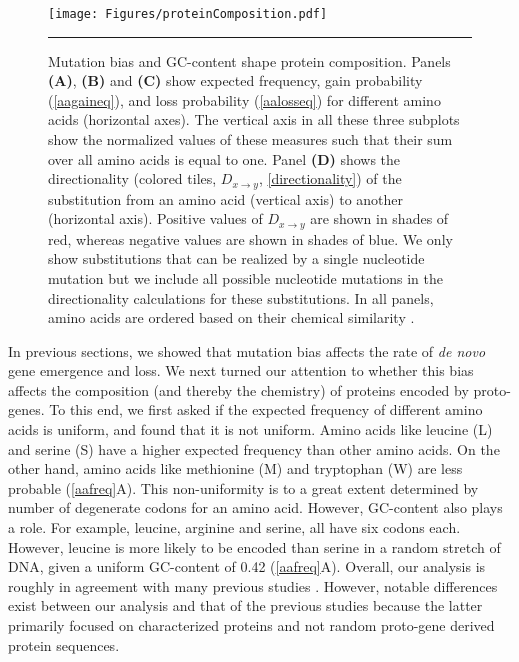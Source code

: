 \documentclass[12pt,a4paper]{article}
\begin{document}
\begin{figure}[!t]
\centering
\texttt{[image: Figures/proteinComposition.pdf]}

\caption{Mutation bias and GC-content shape protein composition. Panels \textbf{(A)}, \textbf{(B)} and \textbf{(C)} show expected frequency, gain probability (\autoref{aagaineq}), and loss probability (\autoref{aalosseq}) for different amino acids (horizontal axes). The vertical axis in all these three subplots show the normalized values of these measures such that their sum over all amino acids is equal to one. Panel \textbf{(D)} shows the directionality (colored tiles, $\textit{D}_{x\to y}$, \autoref{directionality}) of the substitution from an amino acid (vertical axis) to another (horizontal axis). Positive values of $\textit{D}_{x\to y}$ are shown in shades of red, whereas negative values are shown in shades of blue. We only show substitutions that can be realized by a single nucleotide mutation but we include all possible nucleotide mutations in the directionality calculations for these substitutions. In all panels, amino acids are ordered based on their chemical similarity \citep{PMBEC}.}
\label{aafreq}

\vspace{1ex}
\hrule
\end{figure}

In previous sections, we showed that mutation bias affects the rate of \textit{de novo} gene emergence and loss. We next turned our attention to whether this bias affects the composition (and thereby the chemistry) of proteins encoded by proto-genes. To this end, we first asked if the expected frequency of different amino acids is uniform, and found that it is not uniform. Amino acids like leucine (L) and serine (S) have a higher expected frequency than other amino acids. On the other hand, amino acids like methionine (M) and tryptophan (W) are less probable (\autoref{aafreq}{\color{blue}A}). This non-uniformity is to a great extent determined by number of degenerate codons for an amino acid. However, GC-content also plays a role. For example, leucine, arginine and serine, all have six codons each. However, leucine is more likely to be encoded than serine in a random stretch of DNA, given a uniform GC-content of 0.42 (\autoref{aafreq}{\color{blue}A}). Overall, our analysis is roughly in agreement with many previous studies \citep{aasubOhta,aafreq3,aafreq4}. However, notable differences exist between our analysis and that of the previous studies because the latter primarily focused on characterized proteins and not random proto-gene derived protein sequences. 
\end{document}
